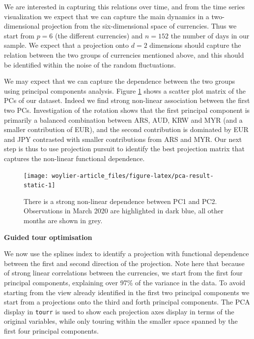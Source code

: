 We are interested in capturing this relations over time, and from the time series visualization we expect that we can capture the main dynamics in a two-dimensional projection from the six-dimensional space of currencies. Thus we start from \(p=6\) (the different currencies) and \(n=152\) the number of days in our sample. We expect that a projection onto \(d=2\) dimensions should capture the relation between the two groups of currencies mentioned above, and this should be identified within the noise of the random fluctuations.

We may expect that we can capture the dependence between the two groups using principal components analysis. Figure \ref{fig:pca-result-static} shows a scatter plot matrix of the PCs of our dataset. Indeed we find strong non-linear association between the first two PCs. Investigation of the rotation shows that the first principal component is primarily a balanced combination between ARS, AUD, KRW and MYR (and a smaller contribution of EUR), and the second contribution is dominated by EUR and JPY contrasted with smaller contributions from ARS and MYR. Our next step is thus to use projection pursuit to identify the best projection matrix that captures the non-linear functional dependence.

\begin{figure}

{\centering \texttt{[image: woylier-article\_files/figure-latex/pca-result-static-1]} 

}

\caption{There is a strong non-linear dependence between PC1 and PC2. Observations in March 2020 are highlighted in dark blue, all other months are shown in grey.}\label{fig:pca-result-static}
\end{figure}

\textbf{Guided tour optimisation}

We now use the splines index to identify a projection with functional dependence between the first and second direction of the projection. Note here that because of strong linear correlations between the currencies, we start from the first four principal components, explaining over 97\% of the variance in the data. To avoid starting from the view already identified in the first two principal components we start from a projections onto the third and forth principal components. The PCA display in \texttt{tourr} is used to show each projection axes display in terms of the original variables, while only touring within the smaller space spanned by the first four principal components.

